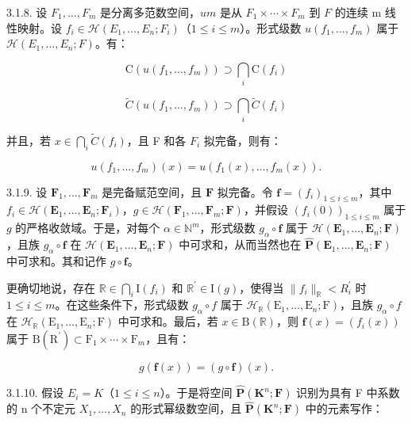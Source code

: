 3.1.8. 设 \(F_1, \ldots, F_m\) 是分离多范数空间，\(u\)\(m\) 是从 \(F_1 \times \cdots \times F_m\) 到 \(F\) 的连续 m 线性映射。设 \(f_i \in \mathcal{H}(E_1, \ldots, E_n; F_i)\)（\(1 \leqslant i \leqslant m\)）。形式级数 \(u(f_1, \ldots, f_m)\) 属于 \(\mathcal{H}(E_1, \ldots, E_n; F)\)。有：

\[
\mathrm{C} (u (f _ {1}, \dots , f _ {m})) \supset \bigcap_ {i} \mathrm{C} (f _ {i})
\]

\[
\tilde {C} (u (f _ {1}, \dots , f _ {m})) \supset \bigcap_ {i} \tilde {C} (f _ {i})
\]

并且，若 \(x \in \bigcap_{i} \tilde{C}(f_i)\)，且 F 和各 \(F_i\) 拟完备，则有：

\[
u (f _ {1}, \dots , f _ {m}) (x) = u (f _ {1} (x), \dots , f _ {m} (x)).
\]

3.1.9. 设 \(\mathbf{F}_1, \ldots, \mathbf{F}_m\) 是完备赋范空间，且 \(\mathbf{F}\) 拟完备。令 \(\mathbf{f} = (f_i)_{1 \leqslant i \leqslant m}\)，其中 \(f_i \in \mathcal{H}(\mathbf{E}_1, \ldots, \mathbf{E}_n; \mathbf{F}_i)\)，\(g \in \mathcal{H}(\mathbf{F}_1, \ldots, \mathbf{F}_m; \mathbf{F})\)，并假设 \((f_i(0))_{1 \leqslant i \leqslant m}\) 属于 \(g\) 的严格收敛域。于是，对每个 \(\alpha \in \mathbb{N}^m\)，形式级数 \(g_\alpha \circ \mathbf{f}\) 属于 \(\mathcal{H}(\mathbf{E}_1, \ldots, \mathbf{E}_n; \mathbf{F})\)，且族 \(g_\alpha \circ \mathbf{f}\) 在 \(\mathcal{H}(\mathbf{E}_1, \ldots, \mathbf{E}_n; \mathbf{F})\) 中可求和，从而当然也在 \(\hat{\mathbf{P}}(\mathbf{E}_1, \ldots, \mathbf{E}_n; \mathbf{F})\) 中可求和。其和记作 \(g \circ \mathbf{f}\)。

更确切地说，存在 \(\mathbb{R}\in\bigcap_{i}\mathrm{I}(f_{i})\) 和 \(\mathbb{R}^{\prime}\in\mathrm{I}(g)\)，使得当 \(\|f_{i}\|_{\mathbb{R}}<R_{i}^{\prime}\) 时 \(1\leqslant i\leqslant m\)。在这些条件下，形式级数 \(g_{\alpha}\circ f\) 属于 \(\mathcal{H}_{\mathbb{R}}(\mathrm{E}_{1},\ldots,\mathrm{E}_{n};\mathrm{F})\)，且族 \(g_{\alpha}\circ f\) 在 \(\mathcal{H}_{\mathbb{R}}(\mathrm{E}_{1},\ldots,\mathrm{E}_{n};\mathrm{F})\) 中可求和。最后，若 \(x\in\mathrm{B}(\mathbb{R})\)，则 \(\mathbf{f}(x)=(f_{i}(x))\) 属于 \(\mathrm{B}(\mathrm{R}^{\prime})\subset\mathrm{F}_{1}\times\cdots\times\mathrm{F}_{m}\)，且有：

\[
g (\mathbf {f} (x)) = (g \circ \mathbf {f}) (x).
\]

3.1.10. 假设 \(E_{i} = K\)（\(1 \leqslant i \leqslant n\)）。于是将空间 \(\hat{\mathbf{P}}(\mathbf{K}^{n}; \mathbf{F})\) 识别为具有 F 中系数的 n 个不定元 \(X_{1}, \ldots, X_{n}\) 的形式幂级数空间，且 \(\hat{\mathbf{P}}(\mathbf{K}^{n};\mathbf{F})\) 中的元素写作：


